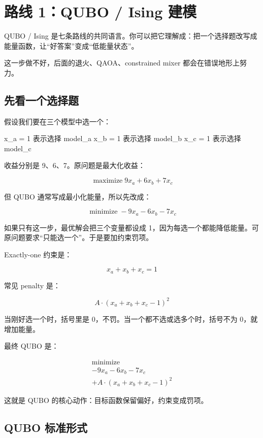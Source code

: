 \documentclass[UTF8,12pt,a4paper]{ctexart}
\begin{document}
\section*{路线 1：QUBO / Ising 建模}

QUBO / Ising 是七条路线的共同语言。你可以把它理解成：把一个选择题改写成能量函数，让“好答案”变成“低能量状态”。

这一步做不好，后面的退火、QAOA、constrained mixer 都会在错误地形上努力。

\subsection*{先看一个选择题}

假设我们要在三个模型中选一个：

\begin{GuideVerbatim}
x_a = 1 表示选择 model_a
x_b = 1 表示选择 model_b
x_c = 1 表示选择 model_c
\end{GuideVerbatim}

收益分别是 9、6、7。原问题是最大化收益：

\[
\operatorname*{maximize} 9 x_{a} + 6 x_{b} + 7 x_{c}
\]

但 QUBO 通常写成最小化能量，所以先改成：

\[
\operatorname*{minimize} -9 x_{a} - 6 x_{b} - 7 x_{c}
\]

如果只有这一步，最优解会把三个变量都设成 1，因为每选一个都能降低能量。可原问题要求“只能选一个”。于是要加约束罚项。

Exactly-one 约束是：

\[
x_{a} + x_{b} + x_{c} = 1
\]

常见 penalty 是：

\[
A \cdot  (x_{a} + x_{b} + x_{c} - 1)^2
\]

当刚好选一个时，括号里是 0，不罚。当一个都不选或选多个时，括号不为 0，就增加能量。

最终 QUBO 是：

\[
\begin{aligned}
\operatorname*{minimize}\\
-9 x_{a} - 6 x_{b} - 7 x_{c}\\
+ A \cdot  (x_{a} + x_{b} + x_{c} - 1)^2
\end{aligned}
\]

这就是 QUBO 的核心动作：目标函数保留偏好，约束变成罚项。

\subsection*{QUBO 标准形式}
\end{document}
